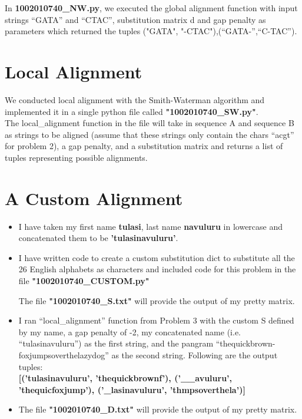 \documentclass{article}
\begin{document}
In \textbf{1002010740\_NW.py}, we executed the global alignment function with input strings “GATA”
and “CTAC”, substitution matrix d and gap penalty as parameters which returned the tuples ("GATA", "-CTAC"),(“GATA-”,“C-TAC”).

\section{Local Alignment}

We conducted local alignment with the Smith-Waterman algorithm and implemented it in a single python file called \textbf{"1002010740\_SW.py"}.
\\

The local\_alignment function in the file will take in
sequence A and sequence B as strings to be aligned (assume that these
strings only contain the chars “acgt” for problem 2), a gap penalty, and a
substitution matrix and returns a list of tuples representing possible
alignments.

\section{A Custom Alignment}
\begin{itemize}
  \item I have taken my first name \textbf{tulasi}, last name \textbf{navuluru} in lowercase and concatenated them to be \textbf{'tulasinavuluru'}.
  \item I have written code to create a custom substitution dict to substitute all the 26 English alphabets as characters and included code for this problem in the file \textbf{"1002010740\_CUSTOM.py"}
  
  The file \textbf{"1002010740\_S.txt"} will provide the output of my pretty matrix.
  
  \item I ran “local\_alignment” function from Problem 3 with the custom S defined by my name, a gap penalty of -2, my concatenated name (i.e. “tulasinavuluru”) as the first string, and the pangram “thequickbrown- foxjumpsoverthelazydog” as the second string. Following are the output tuples:
  \\
  \textbf{[('tulasinavuluru', 'thequickbrownf'), ('\_\_avuluru', 'thequicfoxjump'), ('\_lasinavuluru', 'thmpsoverthela')]}
  
  \item The file \textbf{"1002010740\_D.txt"} will provide the output of my pretty matrix. 
\end{itemize}
\end{document}
